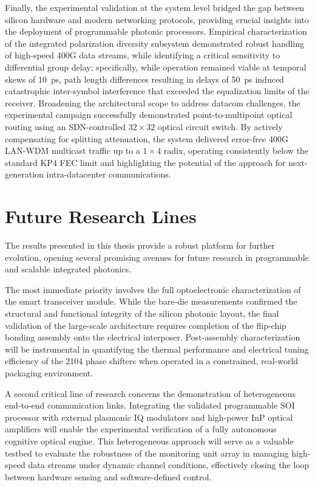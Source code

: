 Finally, the experimental validation at the system level bridged the gap between silicon hardware 
and modern networking protocols, providing crucial insights into the deployment of programmable 
photonic processors.
Empirical characterization of the integrated polarization diversity subsystem demonstrated robust 
handling of high-speed 400G data streams, while identifying a critical sensitivity to differential 
group delay; specifically, while operation remained viable at temporal skews of 10~ps, path length 
differences resulting in delays of 50~ps induced catastrophic inter-symbol interference that 
exceeded the equalization limits of the receiver.
Broadening the architectural scope to address datacom challenges, the experimental campaign 
successfully demonstrated point-to-multipoint optical routing using an SDN-controlled $32\times32$ 
optical circuit switch.
By actively compensating for splitting attenuation, the system delivered error-free 400G LAN-WDM 
multicast traffic up to a $1\times4$ radix, operating consistently below the standard KP4 FEC limit 
and highlighting the potential of the approach for next-generation intra-datacenter communications.

\section{Future Research Lines}
\label{sec:ch6_future}

The results presented in this thesis provide a robust platform for further evolution, opening 
several promising avenues for future research in programmable and scalable integrated photonics.

The most immediate priority involves the full optoelectronic characterization of the smart 
transceiver module.
While the bare-die measurements confirmed the structural and functional integrity of the silicon 
photonic layout, the final validation of the large-scale architecture requires completion of the 
flip-chip bonding assembly onto the electrical interposer.
Post-assembly characterization will be instrumental in quantifying the thermal performance and 
electrical tuning efficiency of the 2104 phase shifters when operated in a constrained, real-world 
packaging environment.

A second critical line of research concerns the demonstration of heterogeneous end-to-end 
communication links.
Integrating the validated programmable SOI processor with external plasmonic IQ modulators and 
high-power InP optical amplifiers will enable the experimental verification of a fully autonomous 
cognitive optical engine.
This heterogeneous approach will serve as a valuable testbed to evaluate the robustness of the 
monitoring unit array in managing high-speed data streams under dynamic channel conditions, 
effectively closing the loop between hardware sensing and software-defined control.

